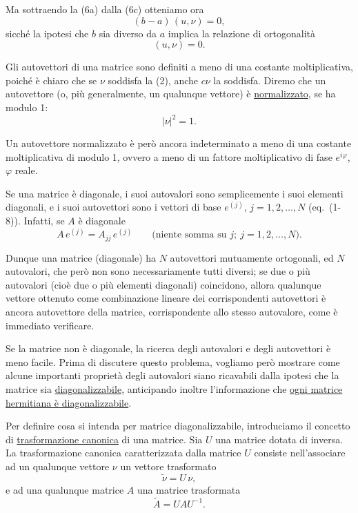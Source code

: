 \documentclass[11pt, a4paper]{book}
\numberwithin{equation}{section}
\begin{document}
Ma sottraendo la (6a) dalla (6c) otteniamo ora
\begin{equation}
(b - a)\,(u, \nu) = 0,
\end{equation}
sicché la ipotesi che $b$ sia diverso da $a$ implica la relazione di
ortogonalità
\begin{equation}
(u, \nu) = 0.
\end{equation}

Gli autovettori di una matrice sono definiti a meno di una costante
moltiplicativa, poiché è chiaro che se $\nu$ soddisfa la (2), anche $c\nu$
la soddisfa. Diremo che un autovettore (o, più generalmente, un qualunque
vettore) è \underline{normalizzato}, se ha modulo 1:
\begin{equation}
|\nu|^2 = 1.
\end{equation}



Un autovettore normalizzato è però ancora indeterminato a meno di una
costante moltiplicativa di modulo 1, ovvero a meno di un fattore
moltiplicativo di fase $e^{i\varphi}$, $\varphi$ reale.

Se una matrice è diagonale, i suoi autovalori sono semplicemente i suoi
elementi diagonali, e i suoi autovettori sono i vettori di base
$e^{(j)}$, $j = 1, 2, \ldots, N$ (eq.\ (1-8)). Infatti, se $A$ è
diagonale
\begin{equation}
A\, e^{(j)} = A_{jj}\, e^{(j)}
\qquad \text{(niente somma su } j;\ j = 1,2,\ldots,N\text{)}.
\end{equation}

Dunque una matrice (diagonale) ha $N$ autovettori mutuamente ortogonali,
ed $N$ autovalori, che però non sono necessariamente tutti diversi; se due
o più autovalori (cioè due o più elementi diagonali) coincidono, allora
qualunque vettore ottenuto come combinazione lineare dei corrispondenti
autovettori è ancora autovettore della matrice, corrispondente allo stesso
autovalore, come è immediato verificare.

Se la matrice non è diagonale, la ricerca degli autovalori e degli
autovettori è meno facile. Prima di discutere questo problema, vogliamo
però mostrare come alcune importanti proprietà degli autovalori siano
ricavabili dalla ipotesi che la matrice sia \underline{diagonalizzabile},
anticipando inoltre l'informazione che \uline{ogni matrice hermitiana è
diagonalizzabile}.

Per definire cosa si intenda per matrice diagonalizzabile, introduciamo il
concetto di \uline{trasformazione canonica} di una matrice. Sia $U$
una matrice dotata di inversa. La trasformazione canonica caratterizzata
dalla matrice $U$ consiste nell'associare ad un qualunque vettore $\nu$ un
vettore trasformato
\begin{equation}
\widetilde{\nu} = U\,\nu,
\end{equation}
e ad una qualunque matrice $A$ una matrice trasformata
\begin{equation}
\widetilde{A} = U A U^{-1}.
\end{equation}
\end{document}
